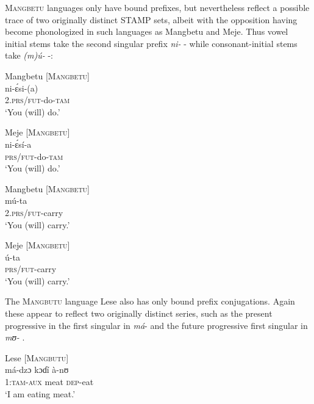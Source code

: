 \documentclass[output=paper]{langsci/langscibook}
\begin{document}
\textsc{Mangbetu} languages only have bound prefixes, but nevertheless reflect a possible trace of two originally distinct STAMP sets, albeit with the opposition having become phonologized in such languages as Mangbetu and Meje. Thus vowel initial stems take the second singular prefix \textit{ni-} - while consonant-initial stems take \textit{(m)ú-} -:


\newcommand{\andersonE}{\'{ɛ}}
\ea\label{ex:anderson:60}
Mangbetu \citep[106]{Larochette1958}        \textsc{[Mangbetu]}\\
\gll ni-{\andersonE}si-(a)      \\
2.\textsc{prs/fut}-do-\textsc{tam}        \\
\glt `You (will) do.' 
\z

\ea\label{ex:anderson:61}
Meje \citep[106]{Larochette1958}           \textsc{[Mangbetu]}\\
\gll ni-{\andersonE}sí-a\\
\textsc{prs/fut}-do-\textsc{tam}\\
\glt `You (will) do.' 
\z

\ea\label{ex:anderson:62}
Mangbetu \citep[106-7]{Larochette1958}        \textsc{[Mangbetu]}\\
\gll mú-ta\\
2.\textsc{prs/fut}-carry    \\
\glt `You (will) carry.'     
\z

\ea\label{ex:anderson:63}
Meje \citep[106-7]{Larochette1958}        \textsc{[Mangbetu]}\\
\gll ú-ta\\
\textsc{prs/fut}-carry\\
\glt `You (will) carry.' 
\z

The \textsc{Mangbutu} language Lese also has only bound prefix conjugations. Again these appear to reflect two originally distinct series, such as the present progressive in the first singular in \textit{má}-  and the future progressive first singular in \textit{mʊ-} .

\ea\label{ex:anderson:64}
Lese \citep[51]{TuckerBryan1966}        \textsc{[Mangbutu]}\\
\gll má-dzɔ    kɔɗí  à-nʊ   \\
1:\textsc{tam-aux}  meat  \textsc{dep}-eat   \\
\glt `I am eating meat.'   
\z
\end{document}
